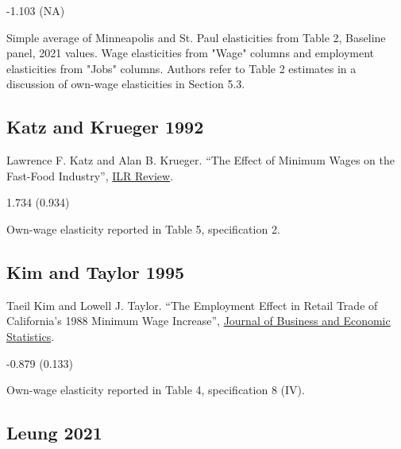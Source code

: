 \vspace{0.7em}

 -1.103 (NA)

\vspace{0.7em}

 Simple average of Minneapolis and St. Paul elasticities from Table 2, Baseline panel, 2021 values. Wage elasticities from "Wage" columns and employment elasticities from "Jobs" columns. Authors refer to Table 2 estimates in a discussion of own-wage elasticities in Section 5.3.

\subsection*{Katz and Krueger 1992}
\vspace{-0.7em}

\noindent Lawrence F. Katz and Alan B. Krueger. ``The Effect of Minimum Wages on the Fast-Food Industry'', \href{https://doi.org/10.1177/001979399204600102}{ILR Review}.

\vspace{0.7em}

 1.734 (0.934)

\vspace{0.7em}

 Own-wage elasticity reported in Table 5, specification 2.

\subsection*{Kim and Taylor 1995}
\vspace{-0.7em}

\noindent Taeil Kim and Lowell J. Taylor. ``The Employment Effect in Retail Trade of California’s 1988 Minimum Wage Increase'', \href{https://doi.org/10.1080/07350015.1995.10524591}{Journal of Business and Economic Statistics}.

\vspace{0.7em}

 -0.879 (0.133)

\vspace{0.7em}

 Own-wage elasticity reported in Table 4, specification 8 (IV).

\subsection*{Leung 2021}
\vspace{-0.7em}

